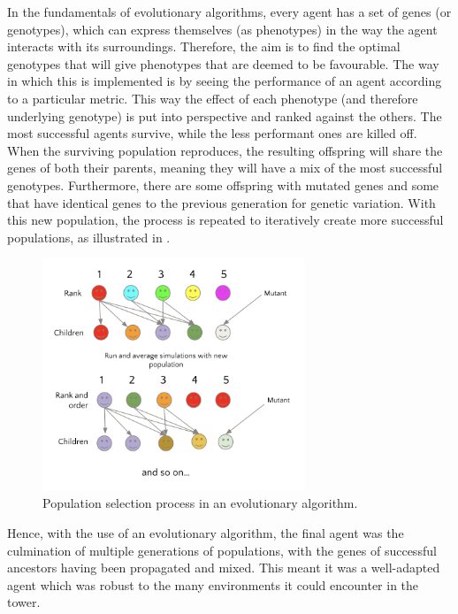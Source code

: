 In the fundamentals of evolutionary algorithms, every agent has a set of genes (or genotypes), which can express themselves (as phenotypes) in the way the agent interacts with its surroundings. Therefore, the aim is to find the optimal genotypes that will give phenotypes that are deemed to be favourable. The way in which this is implemented is by seeing the performance of an agent according to a particular metric. This way the effect of each phenotype (and therefore underlying genotype) is put into perspective and ranked against the others. The most successful agents survive, while the less performant ones are killed off. When the surviving population reproduces, the resulting offspring will share the genes of both their parents, meaning they will have a mix of the most successful genotypes. Furthermore, there are some offspring with mutated genes and some that have identical genes to the previous generation for genetic variation. With this new population, the process is repeated to iteratively create more successful populations, as illustrated in .

\begin{figure}[htb]
    \centering
    \includegraphics[width=0.7\textwidth]{006_team_4_agent_design/assets/evolve.png}
    \caption{Population selection process in an evolutionary algorithm.}
    \label{fig:team4evolve}
\end{figure}

Hence, with the use of an evolutionary algorithm, the final agent was the culmination of multiple generations of populations, with the genes of successful ancestors having been propagated and mixed. This meant it was a well-adapted agent which was robust to the many environments it could encounter in the tower. 

